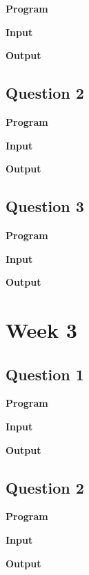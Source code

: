 \documentclass{article}
\begin{document}
\noindent \textbf{\large{Program}}

\newpage
\noindent \textbf{\large{Input}}

\noindent \textbf{\large{Output}}


\newpage
\subsection{Question 2}

\newline 

\noindent \textbf{\large{Program}}

\newpage
\noindent \textbf{\large{Input}}

\noindent \textbf{\large{Output}}


\newpage
\subsection{Question 3}

\newline 

\noindent \textbf{\large{Program}}

\newpage
\noindent \textbf{\large{Input}}

\noindent \textbf{\large{Output}}

\newpage
\section{Week 3}

\subsection{Question 1}

\newline 

\noindent \textbf{\large{Program}}

\newpage
\noindent \textbf{\large{Input}}

\noindent \textbf{\large{Output}}


\newpage
\subsection{Question 2}

\newline 

\noindent \textbf{\large{Program}}

\newpage
\noindent \textbf{\large{Input}}

\noindent \textbf{\large{Output}}

\end{document}

